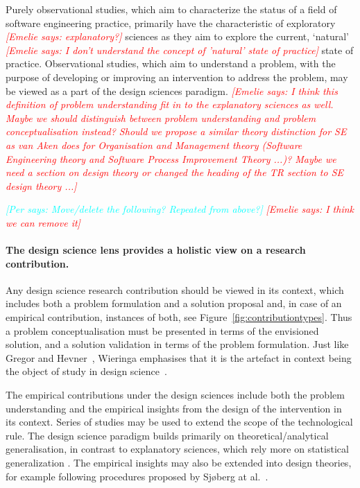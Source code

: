 \documentclass[graybox]{svmult}
\newcommand{\emelie}[1]{\textcolor{red}{{\it [Emelie says: #1]}}}
\newcommand{\per}[1]{\textcolor{cyan}{{\it [Per says: #1]}}}
\newcommand{\emelie}[1]{}
\newcommand{\per}[1]{}
\begin{document}
Purely observational studies, which aim to characterize the status of a field of software engineering practice, primarily have the characteristic of exploratory \emelie{explanatory?} sciences as they aim to explore the current, `natural' \emelie{I don't understand the concept of 'natural' state of practice} state of practice. Observational studies, which aim to understand a problem, with the purpose of developing or improving an intervention to address the problem, may be viewed as a part of the design sciences paradigm. \emelie{I think this definition of problem understanding fit in to the explanatory sciences as well. Maybe we should distinguish between problem understanding and problem conceptualisation instead? Should we propose a similar theory distinction for SE as van Aken does for Organisation and Management theory (Software Engineering theory and Software Process Improvement Theory ...)? Maybe we need a section on design theory or changed the heading of the TR section to SE design theory ...} 

\per{Move/delete the following? Repeated from above?} \emelie{I think we can remove it}
\paragraph{The design science lens provides a holistic view on a research contribution.} 

Any design science research contribution should be viewed in its context, which includes both a problem formulation and a solution proposal and, in case of an empirical contribution, instances of both, see Figure~\ref{fig:contributiontypes}. Thus a problem conceptualisation must be presented in terms of the envisioned solution, and a solution validation in terms of the problem formulation. 
Just like Gregor and Hevner~\cite{gregor_positioning_2013}, Wieringa emphasises that it is the artefact in context being the object of study in design science~\cite{wieringa_design_2009}.

The empirical contributions under the design sciences include both the problem understanding and the empirical insights from the design of the intervention in its context. Series of studies may be used to extend the scope of the technological rule. The design science paradigm builds primarily on theoretical/analytical generalisation, in contrast to explanatory sciences, which rely more on statistical generalization \cite[p. 30]{Runeson12Case}. The empirical insights may also be extended into design theories, for example following procedures proposed by Sj{\o}berg at al.~\cite{sjoberg2008building}.
\end{document}
